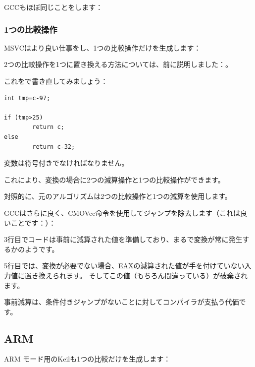 \NonOptimizing GCCもほぼ同じことをします：



\subsubsection{1つの比較操作}
\label{toupper_one_comparison}

\Optimizing MSVCはより良い仕事をし、1つの比較操作だけを生成します：



2つの比較操作を1つに置き換える方法については、前に説明しました：。

これを\CCpp で書き直してみましょう：

\begin{lstlisting}[style=customc]
int tmp=c-97;

if (tmp>25)
        return c;
else
        return c-32;
\end{lstlisting}

変数は符号付きでなければなりません。

これにより、変換の場合に2つの減算操作と1つの比較操作ができます。

対照的に、元のアルゴリズムは2つの比較操作と1つの減算を使用します。

\Optimizing GCCはさらに良く、CMOVcc命令を使用してジャンプを除去します（これは良いことです：）：



3行目でコードは事前に減算された値を準備しており、まるで変換が常に発生するかのようです。

5行目では、変換が必要でない場合、EAXの減算された値が手を付けていない入力値に置き換えられます。
そしてこの値（もちろん間違っている）が破棄されます。

事前減算は、条件付きジャンプがないことに対してコンパイラが支払う代価です。

\subsection{ARM}

ARM モード用の\Optimizing Keilも1つの比較だけを生成します：

